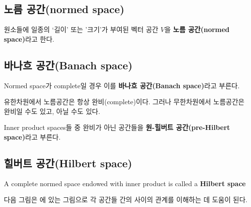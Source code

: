 \documentclass[b5paper,]{scrbook}
\theoremstyle{plain}
\theoremstyle{definition}
\numberwithin{equation}{section}
\let\BeginKnitrBlock\begin \let\EndKnitrBlock\end
\begin{document}
\subsection{노름 공간(normed space)}\label{-normed-space}

\BeginKnitrBlock{definition}[노름 공간]
\protect\hypertarget{def:unnamed-chunk-13}{}{\label{def:unnamed-chunk-13}
{} }원소들에 일종의 `길이' 또는 '크기'가 부여된
벡터 공간 \(V\)을 \textbf{노름 공간(normed space)}라고 한다.
\EndKnitrBlock{definition}

\subsection{바나흐 공간(Banach space)}\label{-banach-space}

\BeginKnitrBlock{definition}[힐버트 공간]
\protect\hypertarget{def:unnamed-chunk-14}{}{\label{def:unnamed-chunk-14}
{} }Normed space가 complete일 경우 이를
\textbf{바나흐 공간(Banach space)}라고 부른다.
\EndKnitrBlock{definition}

유한차원에서 노름공간은 항상 완비(complete)이다. 그러나 무한차원에서
노름공간은 완비일 수도 있고, 아닐 수도 있다.

\BeginKnitrBlock{definition}[원-힐버트 공간]
\protect\hypertarget{def:unnamed-chunk-15}{}{\label{def:unnamed-chunk-15}
{} }Inner product spaces들 중 완비가 아닌
공간들을 \textbf{원-힐버트 공간(pre-Hilbert space)}라고 부른다.
\EndKnitrBlock{definition}

\subsection{힐버트 공간(Hilbert space)}\label{-hilbert-space}

\BeginKnitrBlock{definition}[힐버트 공간]
\protect\hypertarget{def:unnamed-chunk-16}{}{\label{def:unnamed-chunk-16}
{} }A complete normed space endowed with inner
product is called a \textbf{Hilbert space}
\EndKnitrBlock{definition}

다음 그림은 \citep{Shima2016}에 있는 그림으로 각 공간들 간의 사이의
관계를 이해하는 데 도움이 된다.
\end{document}
